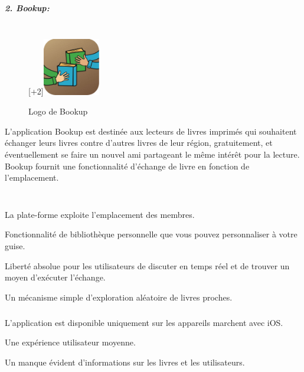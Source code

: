 \subparagraph{{\large 2. Bookup:}\\\\}

\begin{figure}
		\raisebox{0pt}[\dimexpr\height+2\baselineskip\relax]{\includegraphics[width=2.5cm]{Images/chapter1/bookUpLogo.jpg}}
		\caption{Logo de Bookup}
\end{figure}

L'application Bookup est destinée aux lecteurs de livres imprimés qui souhaitent échanger leurs livres contre d'autres livres de leur région, gratuitement, et éventuellement se faire un nouvel ami partageant le même intérêt pour la lecture. Bookup fournit une fonctionnalité d’échange de livre en fonction de l’emplacement.\\\\%

\subparagraph*{}
\begin{list}{•}{\textbf{Avantages}}
	\item La plate-forme exploite l'emplacement des membres.
	\item Fonctionnalité de bibliothèque personnelle que vous pouvez personnaliser à votre guise.
	\item Liberté absolue pour les utilisateurs de discuter en temps réel et de trouver un moyen d'exécuter l'échange.
	\item Un mécanisme simple d'exploration aléatoire de livres proches.
\end{list}

\subparagraph*{}
\begin{list}{•}{\textbf{Inconvénients}}
	\item L'application est disponible uniquement sur les appareils marchent avec iOS.
	\item Une expérience utilisateur moyenne.
	\item Un manque évident d'informations sur les livres et les utilisateurs.
\end{list}

